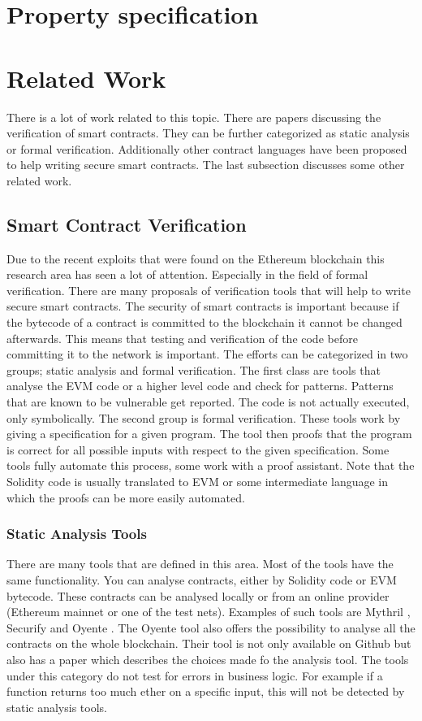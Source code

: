 \documentclass[a4paper]{article}
\begin{document}
\section{Property specification}


\section{Related Work}
There is a lot of work related to this topic. There are papers discussing the verification of smart contracts. They can be further categorized as static analysis or formal verification. Additionally other contract languages have been proposed to help writing secure smart contracts. The last subsection discusses some other related work.

\subsection{Smart Contract Verification}
Due to the recent exploits that were found on the Ethereum blockchain this research area has seen a lot of attention. Especially in the field of formal verification. There are many proposals of verification tools that will help to write secure smart contracts. The security of smart contracts is important because if the bytecode of a contract is committed to the blockchain it cannot be changed afterwards. This means that testing and verification of the code before committing it to the network is important. The efforts can be categorized in two groups; static analysis and formal verification. The first class are tools that analyse the EVM code or a higher level code and check for patterns. Patterns that are known to be vulnerable get reported. The code is not actually executed, only symbolically. The second group is formal verification. These tools work by giving a specification for a given program. The tool then proofs that the program is correct for all possible inputs with respect to the given specification. Some tools fully automate this process, some work with a proof assistant. Note that the Solidity code is usually translated to EVM or some intermediate language in which the proofs can be more easily automated.
\subsubsection{Static Analysis Tools}
There are many tools that are defined in this area. Most of the tools have the same functionality. You can analyse contracts, either by Solidity code or EVM bytecode. These contracts can be analysed locally or from an online provider (Ethereum mainnet or one of the test nets). Examples of such tools are Mythril \cite{mythrilrepo}, Securify \cite{securifywebsite} and Oyente \cite{luu2016making}. The Oyente tool also offers the possibility to analyse all the contracts on the whole blockchain. Their tool is not only available on Github but also has a paper which describes the choices made fo the analysis tool. The tools under this category do not test for errors in business logic. For example if a function returns too much ether on a specific input, this will not be detected by static analysis tools. 
\end{document}
